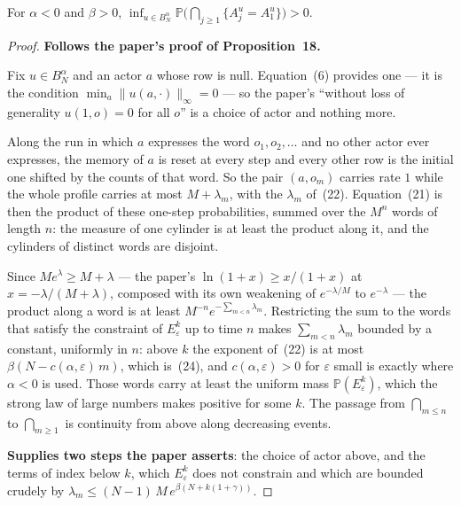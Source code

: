 \begin{proposition}
  \label{prop18}
  \leanok
  For $\alpha < 0$ and $\beta > 0$,
  $\inf_{u \in B_N^\alpha} \mathbb{P}\bigl( \bigcap_{j \ge 1} \{A_j^u = A_1^u\} \bigr) > 0$.
\end{proposition}
\begin{proof}
  \leanok
  \textbf{Follows the paper's proof of Proposition~18.}

  Fix $u \in B_N^\alpha$ and an actor $a$ whose row is null.  Equation~(6)
  provides one --- it is the condition $\min_a \|u(a,\cdot)\|_\infty = 0$ ---
  so the paper's ``without loss of generality $u(1,o) = 0$ for all $o$'' is a
  choice of actor and nothing more.

  Along the run in which $a$ expresses the word $o_1, o_2, \dots$ and no other
  actor ever expresses, the memory of $a$ is reset at every step and every
  other row is the initial one shifted by the counts of that word.  So the pair
  $(a, o_m)$ carries rate $1$ while the whole profile carries at most
  $M + \lambda_m$, with the $\lambda_m$ of~(22).  Equation~(21) is then the
  product of these one-step probabilities, summed over the $M^n$ words of
  length $n$: the measure of one cylinder is at least the product along it, and
  the cylinders of distinct words are disjoint.

  Since $Me^{\lambda} \ge M + \lambda$ --- the paper's $\ln(1+x) \ge x/(1+x)$
  at $x = -\lambda/(M+\lambda)$, composed with its own weakening of
  $e^{-\lambda/M}$ to $e^{-\lambda}$ --- the product along a word is at least
  $M^{-n} e^{-\sum_{m < n} \lambda_m}$.  Restricting the sum to the words that
  satisfy the constraint of $E_\varepsilon^k$ up to time $n$ makes
  $\sum_{m<n} \lambda_m$ bounded by a constant, uniformly in $n$: above $k$ the
  exponent of~(22) is at most $\beta(N - c(\alpha,\varepsilon)\,m)$, which
  is~(24), and $c(\alpha,\varepsilon) > 0$ for $\varepsilon$ small is exactly where
  $\alpha < 0$ is used.  Those words carry at least the uniform mass
  $\mathbb{P}(E_\varepsilon^k)$, which the strong law of large numbers makes
  positive for some $k$.  The passage from $\bigcap_{m \le n}$ to
  $\bigcap_{m \ge 1}$ is continuity from above along decreasing events.

  \textbf{Supplies two steps the paper asserts}: the choice of actor above, and
  the terms of index below $k$, which $E_\varepsilon^k$ does not constrain and
  which are bounded crudely by
  $\lambda_m \le (N-1)\,M\,e^{\beta(N + k(1+\gamma))}$.
\end{proof}

